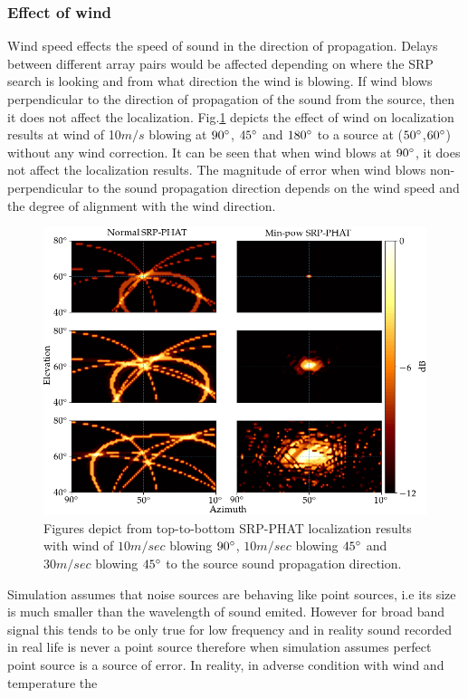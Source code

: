\subsubsection{Effect of wind}
Wind speed effects the speed of sound in the direction of propagation. Delays between different array pairs would be affected depending on where the SRP search is looking and from what direction the wind is blowing. If wind blows perpendicular to the direction of propagation of the sound from the source, then it does not affect the localization. Fig.\ref{fig:4mic2srcWind} depicts the effect of wind on localization results at wind of 10$m/s$ blowing at $90\degree$, $45\degree$ and $180\degree$ to a source at ($50\degree$,$60\degree$) without any wind correction. It can be seen that when wind blows at $90\degree$, it does not affect the localization results. The magnitude of error when wind blows non-perpendicular to the sound propagation direction depends on the wind speed and the degree of alignment with the wind direction.
\begin{figure}[H]
\centering
\includegraphics[width=\textwidth]{Figures/windSim.png}
\caption{Figures depict from top-to-bottom SRP-PHAT localization results with wind of $10 m/sec$ blowing $90\degree$, $10 m/sec$ blowing $45\degree$ and $30 m/sec$ blowing $45\degree$ to the source sound propagation direction.}
\label{fig:4mic2srcWind}
\end{figure}

Simulation assumes that noise sources are behaving like point sources, i.e its size is much smaller than the wavelength of sound emited. However for broad band signal this tends to be only true for low frequency and in reality sound recorded in real life is never a point source therefore when simulation assumes perfect point source is a source of error. In reality, in adverse condition with wind and temperature the 

